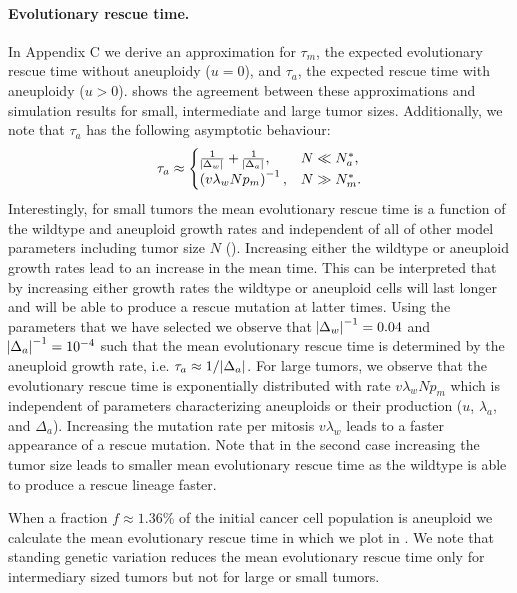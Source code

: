 \documentclass[12pt]{extarticle}
\begin{document}
\paragraph{Evolutionary rescue time.}
In Appendix C we derive an approximation for $\tau_m$, the expected evolutionary rescue time without aneuploidy ($u=0$), and $\tau_a$, the expected rescue time with aneuploidy ($u>0$).  shows the agreement between these approximations and simulation results for small, intermediate and large tumor sizes. Additionally, we note that $\tau_a$ has the following asymptotic behaviour:
\begin{equation}  \label{eq:AsymptoticTimeRules}
\tau_a \approx \begin{cases}
    \frac{1}{\abs{\Delta_w}}+\frac{1}{\abs{\Delta_a}} ,&
 N \ll N_a^* ,\\ 
  \left(v\lambda_wNp_m\right)^{-1}  ,&
  N \gg N_m^* .
  \end{cases}
\end{equation}
Interestingly, for small tumors the mean evolutionary rescue time is a function of the wildtype and aneuploid growth rates and independent of all of other model parameters including tumor size $N$ (). %
Increasing either the wildtype or aneuploid growth rates lead to an increase in the mean time. This can be interpreted that by increasing either growth rates the wildtype or aneuploid cells will last longer and will be able to produce a rescue mutation at latter times. Using the parameters that we have selected we observe that $\abs{\Delta_w}^{-1}=0.04$ and $\abs{\Delta_a}^{-1}=10^{-4}$ such that the mean evolutionary rescue time is determined by the aneuploid growth rate, i.e. $\tau_a\approx1/\abs{\Delta_a}$. For large tumors, we observe that the evolutionary rescue time is exponentially distributed with rate $v\lambda_wNp_m$ which is independent of parameters characterizing aneuploids or their production ($u$, $\lambda_a$, and $\Delta_a$). Increasing the mutation rate per mitosis $v\lambda_w$ leads to a faster appearance of a rescue mutation. Note that in the second case increasing the tumor size leads to smaller mean evolutionary rescue time as the wildtype is able to produce a rescue lineage faster. 

When a fraction $f\approx 1.36\%$ of the initial cancer cell population is aneuploid we calculate the mean evolutionary rescue time in  which we plot in . We note that standing genetic variation reduces the mean evolutionary rescue time only for intermediary sized tumors but not for large or small tumors.
\end{document}
